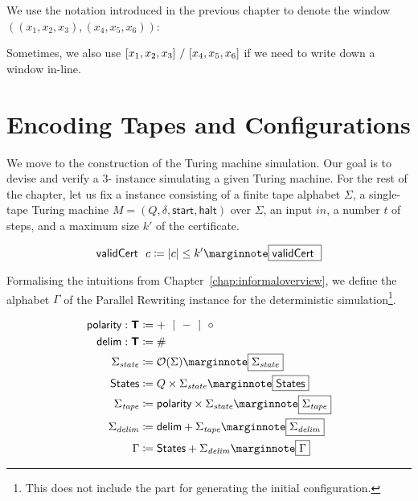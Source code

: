 We use the notation introduced in the previous chapter to denote the window $((x_1, x_2, x_3), (x_4, x_5, x_6))$: 
\begin{center}
\end{center}
Sometimes, we also use $[x_1, x_2, x_3]~/~[x_4, x_5, x_6]$ if we need to write down a window in-line.

\section{Encoding Tapes and Configurations}
We move to the construction of the Turing machine simulation. Our goal is to devise and verify a 3-\PR{} instance simulating a given Turing machine. 
For the rest of the chapter, let us fix a \gennp{} instance consisting of a finite tape alphabet $\Sigma$, a single-tape Turing machine $M = (Q, \delta, \textsf{start}, \textsf{halt})$ over $\Sigma$, an input $in$, a number $t$ of steps, and a maximum size $k'$ of the certificate. 

\begin{definition}
  \[\validCert~c \defeq \length{c} \le k' \mnote{$\validCert$}\]
\end{definition}

Formalising the intuitions from Chapter~\ref{chap:informaloverview}, we define the alphabet $\Gamma$ of the Parallel Rewriting instance for the deterministic simulation\footnote{This does not include the part for generating the initial configuration.}.

\newcommand{\stateSigma}{\Sigma_{\mathit{state}}}
\newcommand{\delimSigma}{\Sigma_{\mathit{delim}}}
\newcommand{\tapeSigma}{\Sigma_{\mathit{tape}}}
\newcommand{\States}{\textsf{States}}

\begin{align*}
  \polarity : \Type &\defeq + \bnfmid - \bnfmid \circ \\
  \textsf{delim} : \Type &\defeq \# \\
  \stateSigma &\defeq \opt{\Sigma} \mnote{$\stateSigma$}\\
  \States &\defeq Q \times \stateSigma \mnote{$\States$}\\
  \tapeSigma &\defeq \polarity \times \stateSigma \mnote{$\tapeSigma$}\\
  \delimSigma &\defeq \textsf{delim} + \tapeSigma \mnote{$\delimSigma$}\\
  \Gamma &\defeq \States + \delimSigma
  \mnote{$\Gamma$}
\end{align*}

